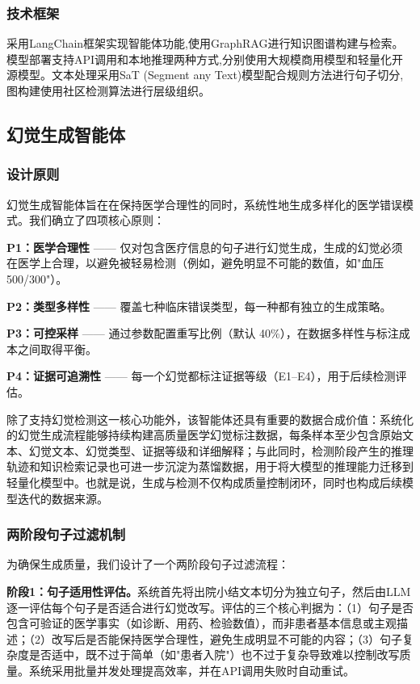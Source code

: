 \documentclass[11pt]{article}
\begin{document}
\subsubsection{技术框架}

采用LangChain框架实现智能体功能,使用GraphRAG进行知识图谱构建与检索。模型部署支持API调用和本地推理两种方式,分别使用大规模商用模型和轻量化开源模型。文本处理采用SaT (Segment any Text)模型\citep{frohmann2024segmentAnyText}配合规则方法进行句子切分,图构建使用社区检测算法进行层级组织。

\subsection{幻觉生成智能体}

\subsubsection{设计原则}

幻觉生成智能体旨在在保持医学合理性的同时，系统性地生成多样化的医学错误模式。我们确立了四项核心原则：

\textbf{P1：医学合理性} ------ 仅对包含医疗信息的句子进行幻觉生成，生成的幻觉必须在医学上合理，以避免被轻易检测（例如，避免明显不可能的数值，如"血压 500/300"）。

\textbf{P2：类型多样性} ------ 覆盖七种临床错误类型，每一种都有独立的生成策略。

\textbf{P3：可控采样} ------ 通过参数配置重写比例（默认 40\%），在数据多样性与标注成本之间取得平衡。

\textbf{P4：证据可追溯性} ------ 每一个幻觉都标注证据等级（E1--E4），用于后续检测评估。

除了支持幻觉检测这一核心功能外，该智能体还具有重要的数据合成价值：系统化的幻觉生成流程能够持续构建高质量医学幻觉标注数据，每条样本至少包含原始文本、幻觉文本、幻觉类型、证据等级和详细解释；与此同时，检测阶段产生的推理轨迹和知识检索记录也可进一步沉淀为蒸馏数据，用于将大模型的推理能力迁移到轻量化模型中。也就是说，生成与检测不仅构成质量控制闭环，同时也构成后续模型迭代的数据来源。

\subsubsection{两阶段句子过滤机制}

为确保生成质量，我们设计了一个两阶段句子过滤流程：

\textbf{阶段1：句子适用性评估。}系统首先将出院小结文本切分为独立句子，然后由LLM逐一评估每个句子是否适合进行幻觉改写。评估的三个核心判据为：（1）句子是否包含可验证的医学事实（如诊断、用药、检验数值），而非患者基本信息或主观描述；（2）改写后是否能保持医学合理性，避免生成明显不可能的内容；（3）句子复杂度是否适中，既不过于简单（如"患者入院"）也不过于复杂导致难以控制改写质量。系统采用批量并发处理提高效率，并在API调用失败时自动重试。
\end{document}

